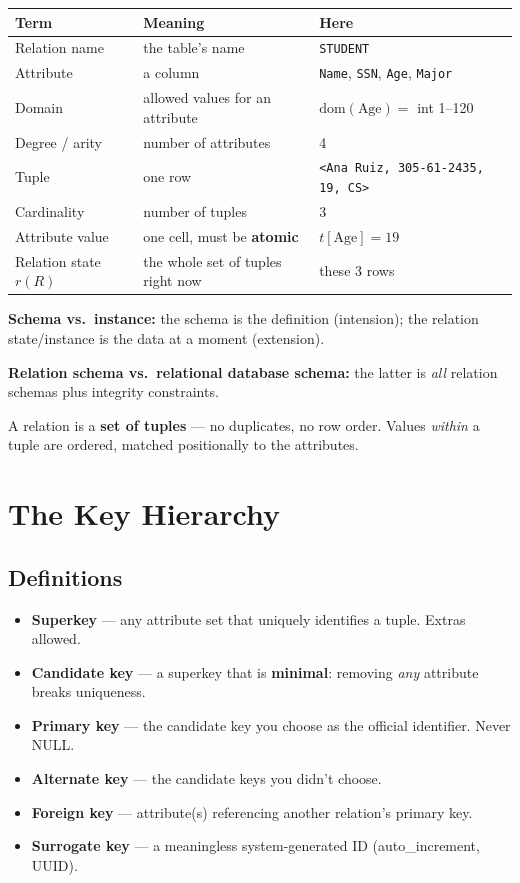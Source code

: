 \documentclass[12pt]{article}
\begin{document}
\begin{table}[H]
\centering
\begin{tabular}{|l|l|l|}
\hline
\textbf{Term} & \textbf{Meaning} & \textbf{Here} \\
\hline
Relation name & the table's name & \texttt{STUDENT} \\
Attribute & a column & \texttt{Name}, \texttt{SSN}, \texttt{Age}, \texttt{Major} \\
Domain & allowed values for an attribute & $\mathrm{dom}(\text{Age}) = $ int 1--120 \\
Degree / arity & number of attributes & 4 \\
Tuple & one row & \texttt{<Ana Ruiz, 305-61-2435, 19, CS>} \\
Cardinality & number of tuples & 3 \\
Attribute value & one cell, must be \textbf{atomic} & $t[\text{Age}] = 19$ \\
Relation state $r(R)$ & the whole set of tuples right now & these 3 rows \\
\hline
\end{tabular}
\end{table}

\textbf{Schema vs.\ instance:} the schema is the definition (intension); the
relation state/instance is the data at a moment (extension).

\textbf{Relation schema vs.\ relational database schema:} the latter is
\emph{all} relation schemas plus integrity constraints.

A relation is a \textbf{set of tuples} --- no duplicates, no row order. Values
\emph{within} a tuple are ordered, matched positionally to the attributes.

\section{The Key Hierarchy}

\subsection*{Definitions}

\begin{itemize}
    \item \textbf{Superkey} --- any attribute set that uniquely identifies a tuple. Extras allowed.
    \item \textbf{Candidate key} --- a superkey that is \textbf{minimal}: removing \emph{any} attribute breaks uniqueness.
    \item \textbf{Primary key} --- the candidate key you choose as the official identifier. Never NULL.
    \item \textbf{Alternate key} --- the candidate keys you didn't choose.
    \item \textbf{Foreign key} --- attribute(s) referencing another relation's primary key.
    \item \textbf{Surrogate key} --- a meaningless system-generated ID (auto\_increment, UUID).
\end{itemize}
\end{document}
